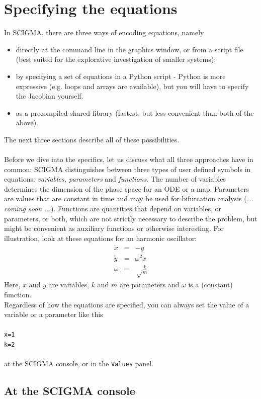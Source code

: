 \documentclass[10pt,a4paper,titlepage]{article}
\newcommand{\T}[1]{\texttt{#1}}
\newcommand{\C}[1]{\\\\\T{#1}\\\\}
\begin{document}
 \newpage\section{Specifying the equations}
 \label{sec::eq}
In SCIGMA, there are three ways of encoding equations, namely
\begin{itemize}
\item directly at the command line in the graphics window, or from a script file (best suited for the explorative investigation of smaller systems);
\item by specifying a set of equations in a Python script - Python is more expressive (e.g. loops and arrays
	are available), but you will have to specify the Jacobian yourself. 
\item	as a precompiled shared library (fastest, but less convenient than both of the above).
\end{itemize}
The next three sections describe all of these possibilities.\\\\
Before we dive into the specifics, let us discuss what all three approaches have in common: SCIGMA distinguishes between three types of user defined symbols in equations: \emph{variables, parameters} and \emph{functions}. The number of variables determines the dimension of the phase space for an ODE or a map. Parameters are values that are constant in time and may be used for bifurcation analysis (\emph{... coming soon ...}). Functions are quantities that depend on variables, or parameters, or both, which are not strictly necessary to describe the problem, but might be convenient as auxiliary functions or otherwise interesting. For illustration, look at these equations for an harmonic oscillator:
\begin{eqnarray}
\dot{x}&=&-y\nonumber\\ 
\dot{y}&=&\omega^2x\nonumber\\
\omega&=&\sqrt\frac{k}{m}
\label{example}
\end{eqnarray}
Here, $x$ and $y$ are variables, $k$ and $m$ are parameters and $\omega$ is a (constant) function.\\
Regardless of how the equations are specified, you can always set the value of a variable or a parameter like this
\C{x=1\\k=2}
at the SCIGMA console, or in the \T{Values} panel.

\subsection{At the SCIGMA console}
\label{sec::internaleq}
\end{document}
